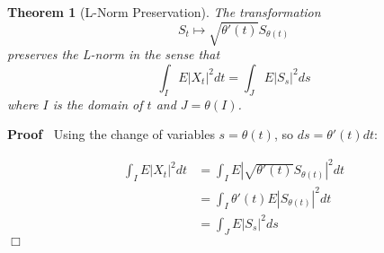 \documentclass{article}
\newenvironment{proof}{\noindent\textbf{Proof\ }}{\hspace*{\fill}$\Box$\medskip}
\newtheorem{theorem}{Theorem}
\begin{document}
\begin{theorem}
  [L{\texttwosuperior}-Norm Preservation] The transformation\textbar
  \begin{equation}
    S_t \mapsto \sqrt{\theta' (t)} S_{\theta (t)}
  \end{equation}
  preserves the L{\texttwosuperior}-norm in the sense that
  \begin{equation}
    \int_I E |X_t |^2 dt = \int_J E |S_s |^2 ds
  \end{equation}
  where $I$ is the domain of $t$ and $J = \theta (I)$.
\end{theorem}

\begin{proof}
  Using the change of variables $s = \theta (t)$, so $ds = \theta' (t) dt$:
  
  \begin{align}
    \int_I E |X_t |^2 dt & = \int_I E \left| \sqrt{\theta' (t)} S_{\theta (t)}
    \right|^2 dt \\
    & = \int_I \theta' (t) E |S_{\theta (t)} |^2 dt \\
    & = \int_J E |S_s |^2 ds 
  \end{align}
\end{proof}
\end{document}
